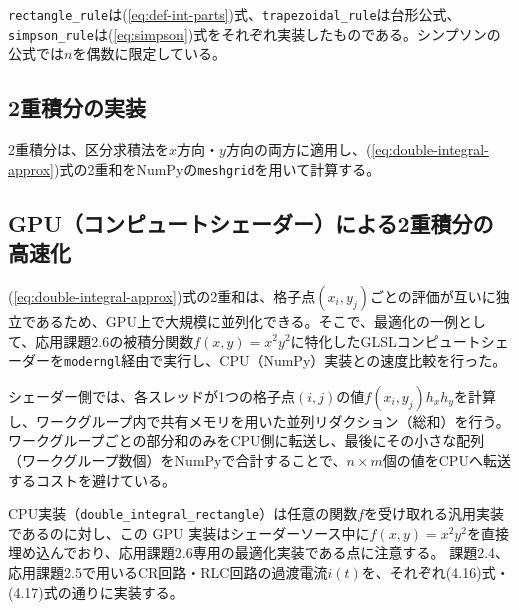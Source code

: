 \documentclass[12pt,a4paper]{ltjsreport}
\begin{document}


\texttt{rectangle\_rule}は(\ref{eq:def-int-parts})式、\texttt{trapezoidal\_rule}は台形公式、\texttt{simpson\_rule}は(\ref{eq:simpson})式をそれぞれ実装したものである。シンプソンの公式では$n$を偶数に限定している。

\newpage
\subsection{2重積分の実装}
2重積分は、区分求積法を$x$方向・$y$方向の両方に適用し、(\ref{eq:double-integral-approx})式の2重和をNumPyの\texttt{meshgrid}を用いて計算する。



\newpage
\subsection{GPU（コンピュートシェーダー）による2重積分の高速化}\label{sec:gpu-double-integral}
(\ref{eq:double-integral-approx})式の2重和は、格子点$(x_i, y_j)$ごとの評価が互いに独立であるため、GPU上で大規模に並列化できる。そこで、最適化の一例として、応用課題2.6の被積分関数$f(x,y)=x^2y^2$に特化したGLSLコンピュートシェーダーを\texttt{moderngl}経由で実行し、CPU（NumPy）実装との速度比較を行った。

シェーダー側では、各スレッドが1つの格子点$(i,j)$の値$f(x_i,y_j)h_xh_y$を計算し、ワークグループ内で共有メモリを用いた並列リダクション（総和）を行う。ワークグループごとの部分和のみをCPU側に転送し、最後にその小さな配列（ワークグループ数個）をNumPyで合計することで、$n\times m$個の値をCPUへ転送するコストを避けている。



CPU実装（\texttt{double\_integral\_rectangle}）は任意の関数$f$を受け取れる汎用実装であるのに対し、この GPU 実装はシェーダーソース中に$f(x,y)=x^2y^2$を直接埋め込んでおり、応用課題2.6専用の最適化実装である点に注意する。
課題2.4、応用課題2.5で用いるCR回路・RLC回路の過渡電流$i(t)$を、それぞれ(4.16)式・(4.17)式の通りに実装する。



\newpage
\end{document}
